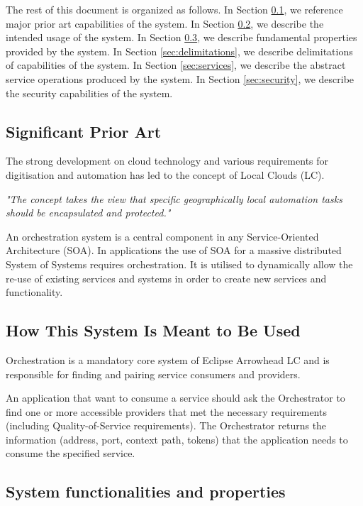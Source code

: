 \documentclass[a4paper]{arrowhead}
\begin{document}
The rest of this document is organized as follows.
In Section \ref{sec:prior_art}, we reference major prior art capabilities
of the system.
In Section \ref{sec:use}, we describe the intended usage of the system.
In Section \ref{sec:properties}, we describe fundamental properties
provided by the system.
In Section \ref{sec:delimitations}, we describe delimitations of capabilities
of the system.
In Section \ref{sec:services}, we describe the abstract service
operations produced by the system.
In Section \ref{sec:security}, we describe the security capabilities
of the system.

\newpage

\subsection{Significant Prior Art}
\label{sec:prior_art}

The strong development on cloud technology and various requirements for digitisation and automation has led to the concept of Local Clouds (LC).

\textit{"The concept takes the view that specific geographically local automation tasks should be encapsulated and protected."} \cite{jerker2017localclouds}

An orchestration system is a central component in any Service-Oriented Architecture (SOA). In applications the use of SOA for a massive distributed System of Systems requires orchestration. It is utilised to dynamically allow the re-use of existing services and systems in order to create new services and functionality. 

\subsection{How This System Is Meant to Be Used}
\label{sec:use}

Orchestration is a mandatory core system of Eclipse Arrowhead LC and is responsible for finding and pairing service consumers and providers. 

An application that want to consume a service should ask the Orchestrator to find one or more accessible providers that met the necessary requirements (including Quality-of-Service requirements). The Orchestrator returns the information (address, port, context path, tokens) that the application needs to consume the specified service.

\subsection{System functionalities and properties}
\label{sec:properties}
\end{document}
